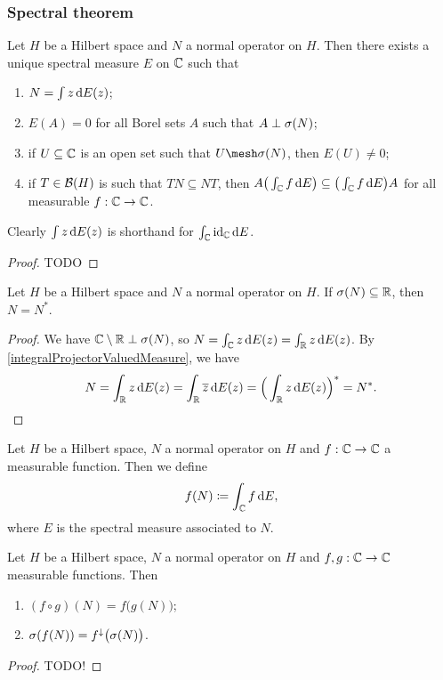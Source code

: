 \subsubsection{Spectral theorem}
\begin{theorem}
Let $H$ be a Hilbert space and $N$ a normal operator on $H$. Then there exists a unique spectral measure $E$ on $\mathbb{C}$ such that
\begin{enumerate}
\item $N = \int z\operatorname{d \!}{E(z)}$;
\item $E(A) = 0$ for all Borel sets $A$ such that $A\perp \sigma(N)$;
\item if $U\subseteq \mathbb{C}$ is an open set such that $U\mesh \spec(N)$, then $E(U) \neq 0$;
\item if $T\in \operatorname{\mathcal{B}}(H)$ is such that $TN\subseteq NT$, then $A\big(\int_{\mathbb{C}} f\operatorname{d \!}{E}\big) \subseteq \big(\int_{\mathbb{C}} f\operatorname{d \!}{E}\big)A$ for all measurable $f:\mathbb{C}\to \mathbb{C}$.
\end{enumerate}
\end{theorem}
Clearly $\int z\operatorname{d \!}{E(z)}$ is shorthand for $\int_{\mathbb{C}}\operatorname{id}_{\mathbb{C}}\operatorname{d \!}{E}$.
\begin{proof}
TODO
\end{proof}
\begin{corollary} \label{realSpectrumSelfAdjoint}
Let $H$ be a Hilbert space and $N$ a normal operator on $H$. If $\sigma(N) \subseteq \mathbb{R}$, then $N = N^*$.
\end{corollary}
\begin{proof}
We have $\mathbb{C}\setminus\mathbb{R} \perp \sigma(N)$, so $N = \int_{\mathbb{C}} z\operatorname{d \!}{E(z)} = \int_{\mathbb{R}} z\operatorname{d \!}{E(z)}$. By \ref{integralProjectorValuedMeasure}, we have
\[ N = \int_{\mathbb{R}} z\operatorname{d \!}{E(z)} = \int_{\mathbb{R}} \overline{z}\operatorname{d \!}{E(z)} = \Big(\int_{\mathbb{R}} z\operatorname{d \!}{E(z)}\Big)^* = N^*. \]
\end{proof}

\begin{definition}
Let $H$ be a Hilbert space, $N$ a normal operator on $H$ and $f: \mathbb{C}\to \mathbb{C}$ a measurable function. Then we define
\[ f(N) \coloneqq \int_{\mathbb{C}} f\operatorname{d \!}{E}, \]
where $E$ is the spectral measure associated to $N$.
\end{definition}

\begin{theorem} \label{spectralTheoremFunctionalCalculus}
Let $H$ be a Hilbert space, $N$ a normal operator on $H$ and $f,g: \mathbb{C}\to \mathbb{C}$ measurable functions. Then
\begin{enumerate}
\item $(f\circ g)(N) = f\big(g(N)\big)$;
\item $\sigma(f(N)) = f^\downarrow\big(\sigma(N)\big)$.
\end{enumerate}
\end{theorem}
\begin{proof}
TODO!
\end{proof}

